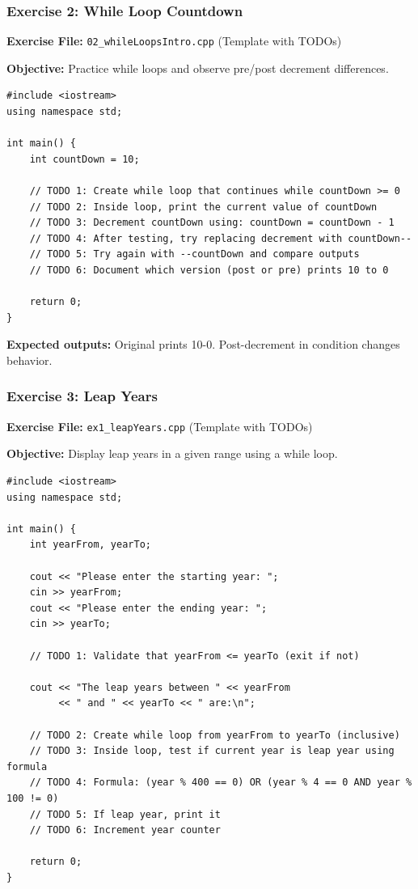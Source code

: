 \documentclass{beamer}
\begin{document}
\begin{frame}[fragile]
\frametitle{Exercise 2: While Loop Countdown}
\textbf{Exercise File:} \texttt{02\_whileLoopsIntro.cpp} (Template with TODOs)

\pause
\textbf{Objective:} Practice while loops and observe pre/post decrement differences.

\begin{verbatim}
#include <iostream>
using namespace std;

int main() {
    int countDown = 10;
    
    // TODO 1: Create while loop that continues while countDown >= 0
    // TODO 2: Inside loop, print the current value of countDown
    // TODO 3: Decrement countDown using: countDown = countDown - 1
    // TODO 4: After testing, try replacing decrement with countDown--
    // TODO 5: Try again with --countDown and compare outputs
    // TODO 6: Document which version (post or pre) prints 10 to 0
    
    return 0;
}
\end{verbatim}

\textbf{Expected outputs:} Original prints 10-0. Post-decrement in condition changes behavior.
\end{frame}

\begin{frame}[fragile]
\frametitle{Exercise 3: Leap Years}
\textbf{Exercise File:} \texttt{ex1\_leapYears.cpp} (Template with TODOs)

\pause
\textbf{Objective:} Display leap years in a given range using a while loop.

\begin{verbatim}
#include <iostream>
using namespace std;

int main() {
    int yearFrom, yearTo;
    
    cout << "Please enter the starting year: ";
    cin >> yearFrom;
    cout << "Please enter the ending year: ";
    cin >> yearTo;
    
    // TODO 1: Validate that yearFrom <= yearTo (exit if not)
    
    cout << "The leap years between " << yearFrom 
         << " and " << yearTo << " are:\n";
    
    // TODO 2: Create while loop from yearFrom to yearTo (inclusive)
    // TODO 3: Inside loop, test if current year is leap year using formula
    // TODO 4: Formula: (year % 400 == 0) OR (year % 4 == 0 AND year % 100 != 0)
    // TODO 5: If leap year, print it
    // TODO 6: Increment year counter
    
    return 0;
}
\end{verbatim}
\end{frame}
\end{document}
